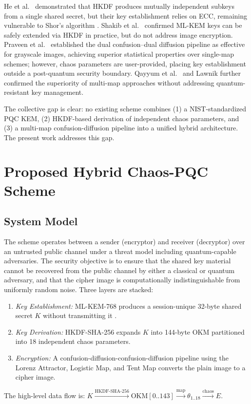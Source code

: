 \documentclass[conference]{IEEEtran}
\begin{document}
He et al.\ \cite{b20} demonstrated that HKDF produces mutually independent subkeys from a single shared secret, but their key establishment relies on ECC, remaining vulnerable to Shor's algorithm \cite{b18}. Shakib et al.\ \cite{b23} confirmed ML-KEM keys can be safely extended via HKDF in practice, but do not address image encryption. Praveen et al.\ \cite{b26,b29} established the dual confusion--dual diffusion pipeline as effective for grayscale images, achieving superior statistical properties over single-map schemes; however, chaos parameters are user-provided, placing key establishment outside a post-quantum security boundary. Qayyum et al.\ \cite{b22} and Lawnik \cite{b25} further confirmed the superiority of multi-map approaches without addressing quantum-resistant key management.

The collective gap is clear: no existing scheme combines (1) a NIST-standardized PQC KEM, (2) HKDF-based derivation of independent chaos parameters, and (3) a multi-map confusion-diffusion pipeline into a unified hybrid architecture. The present work addresses this gap.

\section{Proposed Hybrid Chaos-PQC Scheme}

\subsection{System Model}

The scheme operates between a sender (encryptor) and receiver (decryptor) over an untrusted public channel under a threat model including quantum-capable adversaries. The security objective is to ensure that the shared key material cannot be recovered from the public channel by either a classical or quantum adversary, and that the cipher image is computationally indistinguishable from uniformly random noise. Three layers are stacked:
\begin{enumerate}
	\item \textit{Key Establishment:} ML-KEM-768 produces a session-unique 32-byte shared secret $K$ without transmitting it \cite{b6}.
	\item \textit{Key Derivation:} HKDF-SHA-256 expands $K$ into 144-byte OKM partitioned into 18 independent chaos parameters.
	\item \textit{Encryption:} A confusion-diffusion-confusion-diffusion pipeline using the Lorenz Attractor, Logistic Map, and Tent Map converts the plain image to a cipher image.
\end{enumerate}
The high-level data flow is: $K \xrightarrow{\text{HKDF-SHA-256}} \mathrm{OKM}[0..143] \xrightarrow{\text{map}} \theta_{1..18} \xrightarrow{\text{chaos}} E$.
\end{document}
